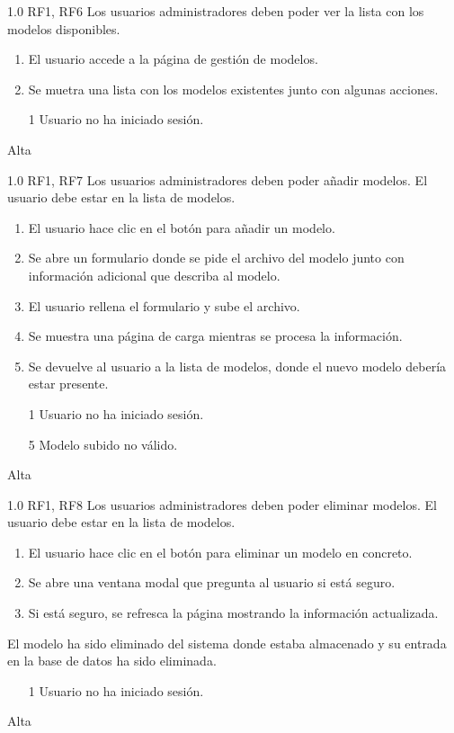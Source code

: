 {1.0}
{RF1, RF6}
{Los usuarios administradores deben poder ver la lista con los modelos disponibles.}
{}
{
    \begin{enumerate}
        \def\labelenumi{\arabic{enumi}.}
        \tightlist
        \item El usuario accede a la página de gestión de modelos.
        \item Se muetra una lista con los modelos existentes junto con algunas acciones.
    \end{enumerate}
}
{}
{
    \begin{itemize}
        \item [1] Usuario no ha iniciado sesión.
    \end{itemize}
}
{Alta}

{1.0}
{RF1, RF7}
{Los usuarios administradores deben poder añadir modelos.}
{El usuario debe estar en la lista de modelos.}
{
    \begin{enumerate}
        \def\labelenumi{\arabic{enumi}.}
        \tightlist
        \item El usuario hace clic en el botón para añadir un modelo.
        \item Se abre un formulario donde se pide el archivo del modelo junto
              con información adicional que describa al modelo.
        \item El usuario rellena el formulario y sube el archivo.
        \item Se muestra una página de carga mientras se procesa la información.
        \item Se devuelve al usuario a la lista de modelos, donde el nuevo
              modelo debería estar presente.
    \end{enumerate}
}
{}
{
    \begin{itemize}
        \item [1] Usuario no ha iniciado sesión.
        \item [5] Modelo subido no válido.
    \end{itemize}
}
{Alta}

{1.0}
{RF1, RF8}
{Los usuarios administradores deben poder eliminar modelos.}
{El usuario debe estar en la lista de modelos.}
{
    \begin{enumerate}
        \def\labelenumi{\arabic{enumi}.}
        \tightlist
        \item El usuario hace clic en el botón para eliminar un modelo en concreto.
        \item Se abre una ventana modal que pregunta al usuario si está seguro.
        \item Si está seguro, se refresca la página mostrando la información actualizada.
    \end{enumerate}
}
{
    El modelo ha sido eliminado del sistema donde estaba almacenado y su entrada en
    la base de datos ha sido eliminada.
}
{
    \begin{itemize}
        \item [1] Usuario no ha iniciado sesión.
    \end{itemize}
}
{Alta}


